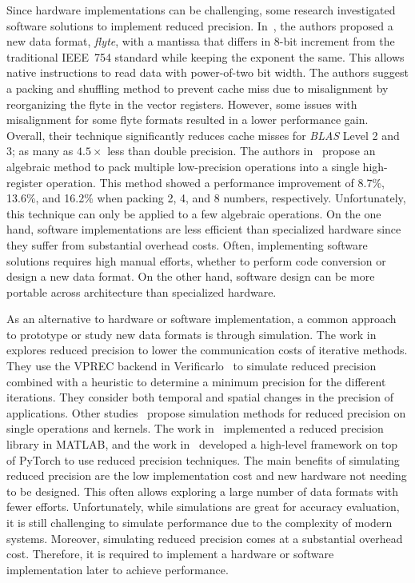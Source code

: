 Since hardware implementations can be challenging, some research investigated
software solutions to implement reduced precision.
In~\cite{Anderson2016-yn}, the authors proposed a new data format, \textit{flyte},
with a mantissa that differs in 8-bit increment from the traditional IEEE~754
standard while keeping the exponent the same.
This allows native instructions to read data with power-of-two bit width.
The authors suggest a packing and shuffling method to prevent cache miss due to misalignment by reorganizing the flyte in the vector registers.
However, some issues with misalignment for some flyte formats resulted in a lower performance gain.
Overall, their technique significantly reduces cache misses for \textit{BLAS} Level 2 and 3; as many as $4.5\times$ less than double precision.
The authors in~\cite{Zucker1994-rg} propose an algebraic method to pack multiple
low-precision operations into a single high-register operation.
This method showed a performance improvement of 8.7\%, 13.6\%, and 16.2\% when packing
2, 4, and 8 numbers, respectively.
Unfortunately, this technique can only be applied to a few algebraic operations.
On the one hand, software implementations are less efficient than specialized hardware
since they suffer from substantial overhead costs.
Often, implementing software solutions requires high manual efforts, whether to
perform code conversion or design a new data format.
On the other hand, software design can be more portable across architecture than specialized hardware.

As an alternative to hardware or software implementation, a common approach to
prototype or study new data formats is through simulation.
The work in~\cite{Chatelain2019-fu} explores reduced precision to lower the communication costs of iterative methods.
They use the VPREC backend in Verificarlo~\cite{Denis2016-ws} to simulate reduced precision combined
with a heuristic to determine a minimum precision for the different iterations.
They consider both temporal and spatial changes in the precision of applications.
Other studies~\cite{Higham2019-yd,Zhang2019-xv} propose simulation methods for reduced
precision on single operations and kernels.
The work in~\cite{Higham2019-yd} implemented a reduced precision library in MATLAB, and
the work in~\cite{Zhang2019-xv} developed a high-level framework on top of PyTorch to use
reduced precision techniques.
The main benefits of simulating reduced precision are the low implementation cost and new hardware not needing to be designed.
This often allows exploring a large number of data formats with fewer efforts.
Unfortunately, while simulations are great for accuracy evaluation, it is still challenging to simulate performance due to the complexity of modern systems.
Moreover, simulating reduced precision comes at a substantial overhead cost.
Therefore, it is required to implement a hardware or software implementation later to achieve performance.

